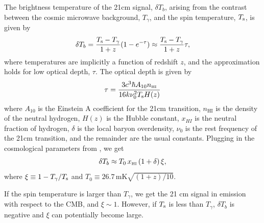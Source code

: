 \documentclass[twocolumn,numberedappendix]{emulateapj} \shorttitle{PSA64}
\newcommand{\Tspin}{T_{\rm s}}
\newcommand{\Tcmb}{T_\gamma}
\begin{document}
The brightness temperature of the 21cm signal, $\delta{T_{b}}$, arising from the
contrast between the cosmic
microwave background, $\Tcmb$, and the spin temperature, $\Tspin$, is given
by 
\begin{equation}\label{eqn:tb}
    \delta{T_{b}} = \frac{\Tspin - \Tcmb}{1+z}(1-e^{-\tau})
\approx \frac{\Tspin - \Tcmb}{1+z}\tau,
\end{equation}
where temperatures are implicitly a function of redshift $z$, and
the approximation holds for low optical depth, $\tau$. 
The optical depth is given by \citep{zaldarriaga_et_al2004}
\begin{equation}\label{eqn:tau}
    \tau = \frac{3c^3\hbar A_{10} n_{\text{\tiny{HI}}}}{16k\nu_0^2\Tspin H(z)}
\end{equation}
where $A_{10}$ is the Einstein A coefficient for the 21cm transition,
$n_{\text{HI}}$ is the density of the neutral hydrogen, $H(z)$ is the Hubble
constant, $x_{HI}$ is the neutral fraction of hydrogen, $\delta$ is the local
baryon overdensity, $\nu_0$ is the rest frequency of the 21cm transition, and 
the remainder are the usual constants.
Plugging in the cosmological parameters from \citet{planck_2015}, 
we get 
\begin{equation}\label{eqn:final_tb}
    \delta{T_{b}} \approx T_{0}\,x_{\text{\tiny{HI}}}\,(1+\delta)\, \xi ,
\end{equation}
where $\xi\equiv1-\Tcmb/\Tspin$ and $T_0\equiv26.7 \,
\text{mK} \sqrt{(1+z)/10}$.

If the spin temperature is larger than $\Tcmb$, we get the 21 cm signal in
emission with respect to the CMB, and $\xi\sim1$. However, if $\Tspin$ is less than $\Tcmb$,
$\delta T_b$ is negative and $\xi$ can potentially become large.
\end{document}
